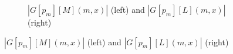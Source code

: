 \documentclass[11pt,reqno,a4letter]{article}
\numberwithin{equation}{section}
\numberwithin{figure}{section}
\numberwithin{table}{section}
\theoremstyle{plain}
\numberwithin{theorem}{section}
\theoremstyle{definition}
\begin{document}
\begin{figure}[ht!]

\captionsetup{singlelinecheck=off}

\begin{subfigure}{\textwidth}
\centering
\begin{subfigure}{0.375\textwidth}
\end{subfigure}\hfil
\centering
\begin{subfigure}{0.375\textwidth}
\end{subfigure}
\captionsetup{justification=centering}
	\caption{$|G[p_m][M](m, x)|$ (left) and $|G[p_m][L](m, x)|$ (right) } 
\end{subfigure}


\end{figure}
\end{document}

